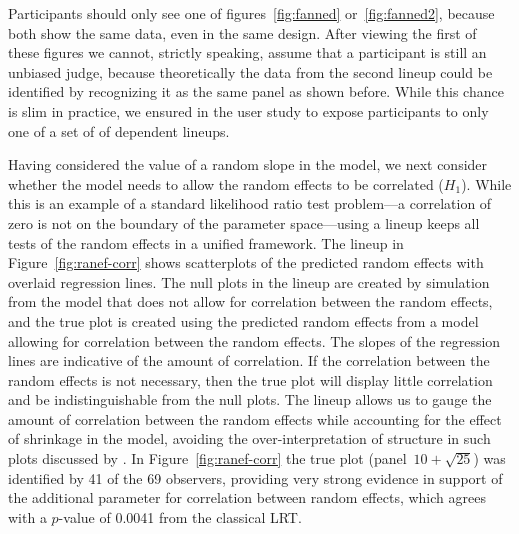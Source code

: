 \documentclass[12pt]{article} %
\newcommand{\alnote}[1]{\todo[inline,color=green!40]{#1}} %
\newcommand{\hhnote}[1]{\todo[inline,color=orange!40]{#1}}
\begin{document}

Participants should only see one of figures~\ref{fig:fanned} or~\ref{fig:fanned2}, because both show the same data, even in the same design. After viewing the first of these figures we cannot, strictly speaking, assume that a participant is still an unbiased judge, because theoretically the data from the  second lineup could be identified by recognizing it as the same panel as shown before. While this chance is slim in practice, we ensured in the user study to expose participants to only one of a set of of dependent lineups.  

Having considered the value of a random slope in the model, we next consider whether the model needs to allow the random effects to be correlated ($H_1$). While this is an example of a standard likelihood ratio test problem---a correlation of zero is not on the boundary of the parameter space---using a lineup keeps all tests of the random effects in a unified framework. The lineup in Figure~\ref{fig:ranef-corr} shows scatterplots of the predicted random effects with overlaid regression lines. 
 The null plots in the lineup are created by simulation from the model that does not allow for correlation between the random effects, and the true plot is created using the predicted random effects from a model allowing for correlation between the random effects.
The slopes of the regression lines are indicative of the amount of correlation. 
 If the correlation between the random effects is not necessary, then the true plot will display little correlation and be indistinguishable from the null plots.
The lineup allows us to gauge the amount of correlation between the random effects while accounting for the effect of shrinkage in the model, avoiding the over-interpretation of structure in such plots discussed by \cite{Morrell:2000ve}.
  In Figure~\ref{fig:ranef-corr} the true plot (panel~$10 + \sqrt{25}$) was identified by 41 of the 69 observers, providing very strong evidence in  support of  the additional parameter for correlation between random effects, which agrees with a $p$-value of 0.0041 from the classical LRT.
\end{document}
